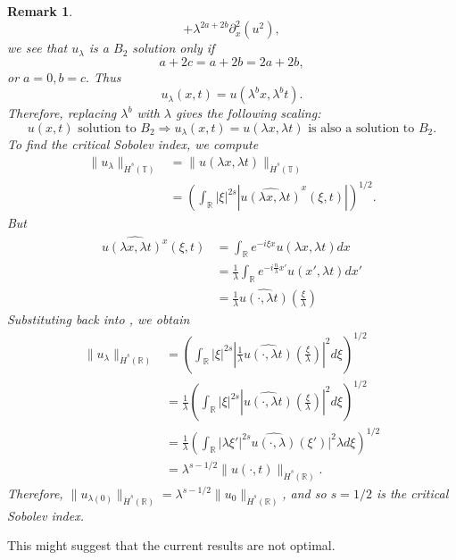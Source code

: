 \documentclass[12pt,reqno]{amsart}
\numberwithin{equation}{section}  %
\renewcommand{\cref}{\Cref}
\newcommand{\rr}{\mathbb{R}}
\newcommand{\ci}{\mathbb{T}}
\newcommand{\wh}{\widehat}
\newtheorem{remark}[theorem]{Remark}
\begin{document}
\begin{appendices}
\begin{itemize}
\begin{framed}
\begin{remark}
$$ +
  \lambda^{2a+2b}
  \partial_x^2(u^2),  
$$
we see that $u_\lambda$ is a $B_2$ solution only if
$$
a+2c=a+2b=2a+2b,
$$
or
$
a=0, b=c.
$
  Thus
\[
u_\lambda (x, t) = u(\lambda^{b}x,  \lambda^{b} t).
\]
%
%
Therefore, replacing  $ \lambda^b$ with  $ \lambda$ gives the following scaling:
%
\begin{equation}
\label{B2-scal}
\boxed{
u(x, t) \text{ solution to }  B_2
 \Longrightarrow 
u_\lambda (x, t) = u(\lambda x, \lambda t)  \text { is also a
solution to }  B_2. 
}
\end{equation}
\label{rem:scaling-B2}
To find the critical Sobolev index, we compute
\\
%
%
\begin{equation}
\begin{split}
  \| u_{\lambda} \|_{\dot{H}^s(\ci)} 
  & =  \| u(\lambda x, \lambda t) \|_{\dot{H}^{s}(\ci)}
  \\
  & = \left( \int_{\rr} | \xi |^{2s} | \wh{u(\lambda x,
  \lambda t)}^x (\xi, t)| \right)^{1/2}.
\end{split}
\label{crit-ind-comp-B2}
\end{equation}
%
But
%
\\
%
\begin{equation*}
\begin{split}
  \wh{u(\lambda x, \lambda t)^x}(\xi, t)
  & = \int_{\rr}e^{-i\xi x}u(\lambda x, \lambda t) dx
  \\
  & = \frac{1}{\lambda} \int_{\rr}e^{-i \frac{n}{\lambda} x'}u(x',
  \lambda t) dx'
  \\
  & = \frac{1}{\lambda} \wh{u(\cdot, \lambda t)}(\frac{\xi}{\lambda})
\end{split}
\end{equation*}
%
%
Substituting back into \cref{crit-ind-comp-B2}, we obtain
%
%
\begin{equation*}
\begin{split}
  \| u_{\lambda} \|_{\dot{H}^s(\rr)} 
  & = \left( \int_{\rr} | \xi |^{2s} |
  \frac{1}{\lambda}\wh{u(\cdot, \lambda t)}(\frac{\xi}{\lambda}) |^2 d \xi
  \right)^{1/2}
  \\
  & = \frac{1}{\lambda} \left( \int_{\rr}| \xi |^{2s} | \wh{u(\cdot,
  \lambda t)}(\frac{\xi}{\lambda}) |^2 d \xi  \right)^{1/2}
  \\
  & = \frac{1}{\lambda} \left( \int_{\rr} | \lambda \xi' |^{2s} 
  \wh{u(\cdot, \lambda)}(\xi') |^2 \lambda d \xi
  \right)^{1/2}
  \\
  & = \lambda^{s - 1/2} \|u(\cdot, t) \|_{\dot{H}^s (\rr)}.
\end{split}
\end{equation*}
%
%
Therefore, $\| u_{\lambda(0)} \|_{\dot{H}^s(\rr)} = \lambda^{s - 1/2} \|
u_{0} \|_{\dot{H}^{s}(\rr)}$, and so $s=1/2$ is the critical Sobolev index.
\end{remark}
\end{framed}
\end{itemize}
This might suggest that the current results are not optimal.
\end{appendices}
\end{document}
